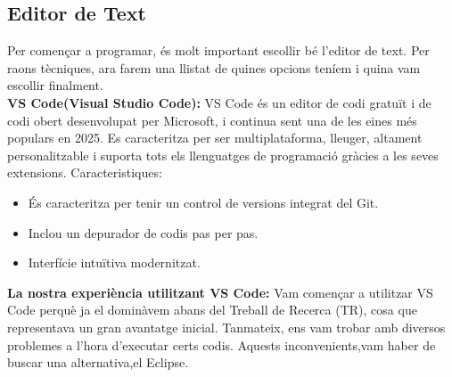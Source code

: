 \subsection{Editor de Text}
Per començar a programar, és molt important escollir bé l'editor de text. Per raons tècniques, ara farem una llistat de quines opcions teníem i quina vam escollir finalment. \\

\textbf{VS Code(Visual Studio Code):}
VS Code és un editor de codi gratuït i de codi obert desenvolupat per Microsoft, i continua sent una de les eines més populars en 2025. Es caracteritza per ser multiplataforma, lleuger, altament personalitzable i suporta tots els llenguatges de programació gràcies a les seves extensions.
Caracteristiques:
\begin{itemize}
 \item És caracteritza per tenir un control de versions integrat del Git.
 \item Inclou un depurador de codis pas per pas.
 \item Interfície intuïtiva modernitzat.
\end{itemize}
\textbf{La nostra experiència utilitzant VS Code:}
Vam començar a utilitzar VS Code perquè ja el dominàvem abans del Treball de Recerca (TR), cosa que representava un gran avantatge inicial. Tanmateix, ens vam trobar amb diversos problemes a l'hora d'executar certs codis. Aquests inconvenients,vam haber de buscar una alternativa,el Eclipse. \\

